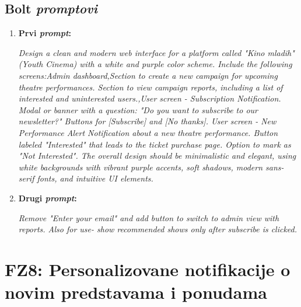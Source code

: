 \subsection{Bolt \textit{promptovi}}

\begin{enumerate}[itemsep=1ex]
    \item \textbf{Prvi \textit{prompt}:}

    \textit{
    Design a clean and modern web interface for a platform called "Kino mladih" (Youth Cinema) with a white and purple color scheme. Include the following screens:Admin dashboard,Section to create a new campaign for upcoming theatre performances. Section to view campaign reports, including a list of interested and uninterested users.,User screen - Subscription Notification. Modal or banner with a question: "Do you want to subscribe to our newsletter?" Buttons for [Subscribe] and [No thanks]. User screen - New Performance Alert Notification about a new theatre performance. Button labeled "Interested" that leads to the ticket purchase page. Option to mark as "Not Interested". The overall design should be minimalistic and elegant, using white backgrounds with vibrant purple accents, soft shadows, modern sans-serif fonts, and intuitive UI elements.}
    \item \textbf{Drugi \textit{prompt}:}

    \textit{Remove "Enter your email" and add button to switch to admin view with reports. Also for use- show recommended shows only after subscribe is clicked.}    
\end{enumerate}
\section{FZ8: Personalizovane notifikacije o novim predstavama i ponudama} 
\sloppy  
